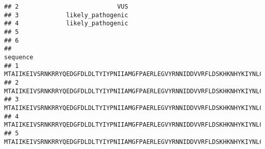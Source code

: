 \documentclass[
]{article}
\begin{document}
\begin{verbatim}
## 2                           VUS
## 3             likely_pathogenic
## 4             likely_pathogenic
## 5                              
## 6                              
##                                                                                                                                                                                                                                                                                                                                                                                                              sequence
## 1 MTAIIKEIVSRNKRRYQEDGFDLDLTYIYPNIIAMGFPAERLEGVYRNNIDDVVRFLDSKHKNHYKIYNLCAERHYDTAKFNCRVAQYPFEDHNPPQLELIKPFCEDLDQWLSEDDNHVAAIHCKAGKGRTGVMICAYLLHRGKFLKAQEALDFYGEVRTRDKKGVTIPSQRRYVYYYSYLLKNHLDYRPVALLFHKMMFETIPMFSGGTCNPQFVVCQLKVKIYSSNSGPTRREDKFMYFEFPQPLPVCGDIKVEFFHKQNKMLKKDKMFHFWVNTFFIPGPEETSEKVENGSLCDQEIDSICSIERADNDKEYLVLTLTKNDLDKANKDKANRYFSPNFKVKLYFTKTVEEPSNPEASSSTSVTPDVSDNEPDHYRYSDTTDSDPENEPFDEDQHTQITKV
## 2 MTAIIKEIVSRNKRRYQEDGFDLDLTYIYPNIIAMGFPAERLEGVYRNNIDDVVRFLDSKHKNHYKIYNLCAERHYDTAKFNCRVAQYPFEDHNPPQLELIKPFCEDLDQWLSEDDNHVAAIHCKAGKGRTGVMICAYLLHRGKFLKAQEALDFYGEVRTRDKKGVTIPSQRRYVYYYSYLLKNHLDYRPVALLFHKMMFETIPMFSGGTCNPQFVVCQLKVKIYSSNSGPTRREDKFMYFEFPQPLPVCGDIKVEFFHKQNKMLKKDKMFHFWVNTFFIPGPEETSEKVENGSLCDQEIDSICSIERADNDKEYLVLTLTKNDLDKANKDKANRYFSPNFKVKLYFTKTVEEPSNPEASSSTSVTPDVSDNEPDHYRYSDTTDSDPENEPFDEDQHTQITKV
## 3 MTAIIKEIVSRNKRRYQEDGFDLDLTYIYPNIIAMGFPAERLEGVYRNNIDDVVRFLDSKHKNHYKIYNLCAERHYDTAKFNCRVAQYPFEDHNPPQLELIKPFCEDLDQWLSEDDNHVAAIHCKAGKGRTGVMICAYLLHRGKFLKAQEALDFYGEVRTRDKKGVTIPSQRRYVYYYSYLLKNHLDYRPVALLFHKMMFETIPMFSGGTCNPQFVVCQLKVKIYSSNSGPTRREDKFMYFEFPQPLPVCGDIKVEFFHKQNKMLKKDKMFHFWVNTFFIPGPEETSEKVENGSLCDQEIDSICSIERADNDKEYLVLTLTKNDLDKANKDKANRYFSPNFKVKLYFTKTVEEPSNPEASSSTSVTPDVSDNEPDHYRYSDTTDSDPENEPFDEDQHTQITKV
## 4 MTAIIKEIVSRNKRRYQEDGFDLDLTYIYPNIIAMGFPAERLEGVYRNNIDDVVRFLDSKHKNHYKIYNLCAERHYDTAKFNCRVAQYPFEDHNPPQLELIKPFCEDLDQWLSEDDNHVAAIHCKAGKGRTGVMICAYLLHRGKFLKAQEALDFYGEVRTRDKKGVTIPSQRRYVYYYSYLLKNHLDYRPVALLFHKMMFETIPMFSGGTCNPQFVVCQLKVKIYSSNSGPTRREDKFMYFEFPQPLPVCGDIKVEFFHKQNKMLKKDKMFHFWVNTFFIPGPEETSEKVENGSLCDQEIDSICSIERADNDKEYLVLTLTKNDLDKANKDKANRYFSPNFKVKLYFTKTVEEPSNPEASSSTSVTPDVSDNEPDHYRYSDTTDSDPENEPFDEDQHTQITKV
## 5 MTAIIKEIVSRNKRRYQEDGFDLDLTYIYPNIIAMGFPAERLEGVYRNNIDDVVRFLDSKHKNHYKIYNLCAERHYDTAKFNCRVAQYPFEDHNPPQLELIKPFCEDLDQWLSEDDNHVAAIHCKAGKGRTGVMICAYLLHRGKFLKAQEALDFYGEVRTRDKKGVTIPSQRRYVYYYSYLLKNHLDYRPVALLFHKMMFETIPMFSGGTCNPQFVVCQLKVKIYSSNSGPTRREDKFMYFEFPQPLPVCGDIKVEFFHKQNKMLKKDKMFHFWVNTFFIPGPEETSEKVENGSLCDQEIDSICSIERADNDKEYLVLTLTKNDLDKANKDKANRYFSPNFKVKLYFTKTVEEPSNPEASSSTSVTPDVSDNEPDHYRYSDTTDSDPENEPFDEDQHTQITKV

\end{verbatim}
\end{document}
